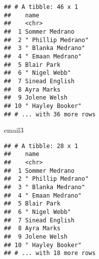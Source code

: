 \documentclass[]{article}
\newenvironment{Shaded}{\begin{snugshade}}{\end{snugshade}}
\newcommand{\KeywordTok}[1]{\textcolor[rgb]{0.13,0.29,0.53}{\textbf{#1}}}
\newcommand{\DataTypeTok}[1]{\textcolor[rgb]{0.13,0.29,0.53}{#1}}
\newcommand{\StringTok}[1]{\textcolor[rgb]{0.31,0.60,0.02}{#1}}
\newcommand{\CommentTok}[1]{\textcolor[rgb]{0.56,0.35,0.01}{\textit{#1}}}
\newcommand{\OperatorTok}[1]{\textcolor[rgb]{0.81,0.36,0.00}{\textbf{#1}}}
\newcommand{\NormalTok}[1]{#1}
\begin{document}
\begin{Shaded}
\end{Shaded}

\begin{verbatim}
## # A tibble: 46 x 1
##    name              
##    <chr>             
##  1 Sommer Medrano    
##  2 " Phillip Medrano"
##  3 " Blanka Medrano" 
##  4 " Emaan Medrano"  
##  5 Blair Park        
##  6 " Nigel Webb"     
##  7 Sinead English    
##  8 Ayra Marks        
##  9 Jolene Welsh      
## 10 " Hayley Booker"  
## # ... with 36 more rows
\end{verbatim}

\begin{Shaded}
\begin{Highlighting}[]
\NormalTok{email3}
\end{Highlighting}
\end{Shaded}

\begin{verbatim}
## # A tibble: 28 x 1
##    name              
##    <chr>             
##  1 Sommer Medrano    
##  2 " Phillip Medrano"
##  3 " Blanka Medrano" 
##  4 " Emaan Medrano"  
##  5 Blair Park        
##  6 " Nigel Webb"     
##  7 Sinead English    
##  8 Ayra Marks        
##  9 Jolene Welsh      
## 10 " Hayley Booker"  
## # ... with 18 more rows
\end{verbatim}
\end{document}
